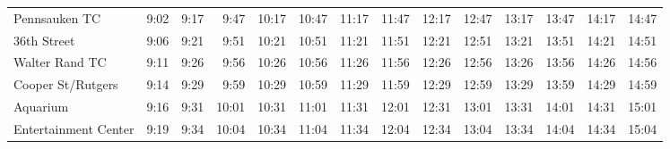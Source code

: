 \begin{center}
\begin{tabular}{@{}lrrrrrrrrrrrrr@{}}
Pennsauken TC & 9:02 & 9:17 & 9:47 & 10:17 & 10:47 & 11:17 & 11:47 & 12:17 & 12:47 & 13:17 & 13:47 & 14:17 & 14:47 \\
36th Street & 9:06 & 9:21 & 9:51 & 10:21 & 10:51 & 11:21 & 11:51 & 12:21 & 12:51 & 13:21 & 13:51 & 14:21 & 14:51 \\
Walter Rand TC & 9:11 & 9:26 & 9:56 & 10:26 & 10:56 & 11:26 & 11:56 & 12:26 & 12:56 & 13:26 & 13:56 & 14:26 & 14:56 \\
Cooper St/Rutgers & 9:14 & 9:29 & 9:59 & 10:29 & 10:59 & 11:29 & 11:59 & 12:29 & 12:59 & 13:29 & 13:59 & 14:29 & 14:59 \\
Aquarium & 9:16 & 9:31 & 10:01 & 10:31 & 11:01 & 11:31 & 12:01 & 12:31 & 13:01 & 13:31 & 14:01 & 14:31 & 15:01 \\
Entertainment Center & 9:19 & 9:34 & 10:04 & 10:34 & 11:04 & 11:34 & 12:04 & 12:34 & 13:04 & 13:34 & 14:04 & 14:34 & 15:04 \\
\bottomrule\end{tabular}\end{center}
